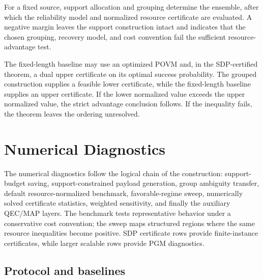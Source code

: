 \documentclass[
 reprint,
 amsmath,amssymb,
 aps,
 pra,
 floatfix,
]{revtex4-2}
\begin{document}
For a fixed source, support allocation and grouping determine the ensemble, after which the reliability model and normalized resource certificate are evaluated. A negative margin leaves the support construction intact and indicates that the chosen grouping, recovery model, and cost convention fail the sufficient resource-advantage test.

The fixed-length baseline may use an optimized POVM and, in the SDP-certified theorem, a dual upper certificate on its optimal success probability. The grouped construction supplies a feasible lower certificate, while the fixed-length baseline supplies an upper certificate. If the lower normalized value exceeds the upper normalized value, the strict advantage conclusion follows. If the inequality fails, the theorem leaves the ordering unresolved.

\section{Numerical Diagnostics}
\label{sec:numerical_results}

The numerical diagnostics follow the logical chain of the construction: support-budget saving, support-constrained payload generation, group ambiguity transfer, default resource-normalized benchmark, favorable-regime sweep, numerically solved certificate statistics, weighted sensitivity, and finally the auxiliary QEC/MAP layers. The benchmark tests representative behavior under a conservative cost convention; the sweep maps structured regions where the same resource inequalities become positive. SDP certificate rows provide finite-instance certificates, while larger scalable rows provide PGM diagnostics.

\subsection{Protocol and baselines}
\end{document}
